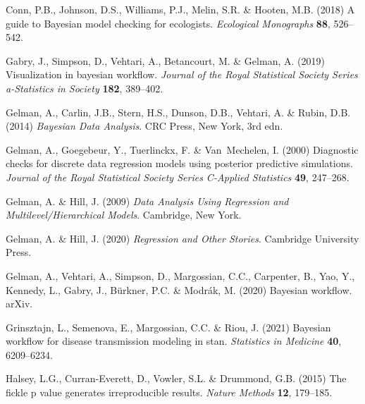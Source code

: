 \documentclass[11pt]{article}
\begin{document}
\begin{thebibliography}{35}
Conn, P.B., Johnson, D.S., Williams, P.J., Melin, S.R. \& Hooten, M.B. (2018)
  {A guide to Bayesian model checking for ecologists}. \emph{Ecological
  Monographs} \textbf{88}, 526--542.

Gabry, J., Simpson, D., Vehtari, A., Betancourt, M. \& Gelman, A. (2019)
  Visualization in bayesian workflow. \emph{Journal of the Royal Statistical
  Society Series a-Statistics in Society} \textbf{182}, 389--402.

Gelman, A., Carlin, J.B., Stern, H.S., Dunson, D.B., Vehtari, A. \& Rubin, D.B.
  (2014) \emph{Bayesian Data Analysis}. CRC Press, New York, 3rd edn.

Gelman, A., Goegebeur, Y., Tuerlinckx, F. \& Van~Mechelen, I. (2000) Diagnostic
  checks for discrete data regression models using posterior predictive
  simulations. \emph{Journal of the Royal Statistical Society Series C-Applied
  Statistics} \textbf{49}, 247--268.

Gelman, A. \& Hill, J. (2009) \emph{Data Analysis Using Regression and
  Multilevel/Hierarchical Models}. Cambridge, New York.

Gelman, A. \& Hill, J. (2020) \emph{Regression and Other Stories}. Cambridge
  University Press.

Gelman, A., Vehtari, A., Simpson, D., Margossian, C.C., Carpenter, B., Yao, Y.,
  Kennedy, L., Gabry, J., B{\"u}rkner, P.C. \& Modr{\'a}k, M. (2020) Bayesian
  workflow. arXiv.

Grinsztajn, L., Semenova, E., Margossian, C.C. \& Riou, J. (2021) Bayesian
  workflow for disease transmission modeling in stan. \emph{Statistics in
  Medicine} \textbf{40}, 6209--6234.

Halsey, L.G., Curran-Everett, D., Vowler, S.L. \& Drummond, G.B. (2015) The
  fickle p value generates irreproducible results. \emph{Nature Methods}
  \textbf{12}, 179--185.


\end{thebibliography}
\end{document}
